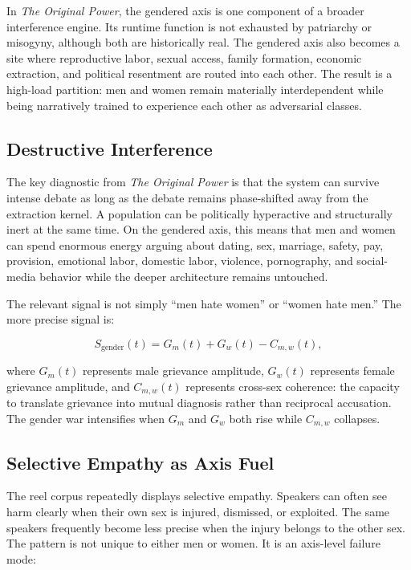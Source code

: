 \documentclass[12pt]{article}
\newcommand{\OP}{\textit{The Original Power}}
\begin{document}
In \OP, the gendered axis is one component of a broader interference engine. Its runtime function is not exhausted by patriarchy or misogyny, although both are historically real. The gendered axis also becomes a site where reproductive labor, sexual access, family formation, economic extraction, and political resentment are routed into each other. The result is a high-load partition: men and women remain materially interdependent while being narratively trained to experience each other as adversarial classes.

\subsection{Destructive Interference}

The key diagnostic from \OP{} is that the system can survive intense debate as long as the debate remains phase-shifted away from the extraction kernel. A population can be politically hyperactive and structurally inert at the same time. On the gendered axis, this means that men and women can spend enormous energy arguing about dating, sex, marriage, safety, pay, provision, emotional labor, domestic labor, violence, pornography, and social-media behavior while the deeper architecture remains untouched.

The relevant signal is not simply ``men hate women'' or ``women hate men.'' The more precise signal is:

\begin{equation}
  S_{\text{gender}}(t) = G_m(t) + G_w(t) - C_{m,w}(t),
\end{equation}

where $G_m(t)$ represents male grievance amplitude, $G_w(t)$ represents female grievance amplitude, and $C_{m,w}(t)$ represents cross-sex coherence: the capacity to translate grievance into mutual diagnosis rather than reciprocal accusation. The gender war intensifies when $G_m$ and $G_w$ both rise while $C_{m,w}$ collapses.

\subsection{Selective Empathy as Axis Fuel}

The reel corpus repeatedly displays selective empathy. Speakers can often see harm clearly when their own sex is injured, dismissed, or exploited. The same speakers frequently become less precise when the injury belongs to the other sex. The pattern is not unique to either men or women. It is an axis-level failure mode:
\end{document}
